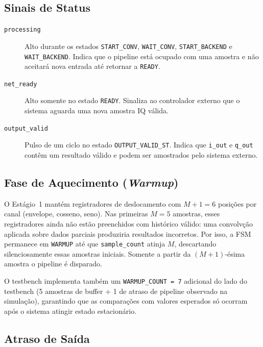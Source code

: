 \documentclass[a4paper,12pt]{article}
\begin{document}
\subsection{Sinais de Status}

\begin{description}
    \item[\texttt{processing}] Alto durante os estados \texttt{START\_CONV}, \texttt{WAIT\_CONV}, \texttt{START\_BACKEND} e \texttt{WAIT\_BACKEND}. Indica que o pipeline est\'a ocupado com uma amostra e n\~ao aceitar\'a nova entrada at\'e retornar a \texttt{READY}.

    \item[\texttt{net\_ready}] Alto somente no estado \texttt{READY}. Sinaliza ao controlador externo que o sistema aguarda uma nova amostra IQ v\'alida.

    \item[\texttt{output\_valid}] Pulso de um ciclo no estado \texttt{OUTPUT\_VALID\_ST}. Indica que \texttt{i\_out} e \texttt{q\_out} cont\^em um resultado v\'alido e podem ser amostrados pelo sistema externo.
\end{description}

\subsection{Fase de Aquecimento (\textit{Warmup})}

O Est\'agio~1 mant\'em registradores de deslocamento com $M+1=6$ posi\c{c}\~oes por canal (envelope, cosseno, seno). Nas primeiras $M=5$ amostras, esses registradores ainda n\~ao est\~ao preenchidos com hist\'orico v\'alido: uma convolv\c{c}\~ao aplicada sobre dados parciais produziria resultados incorretos. Por isso, a FSM permanece em \texttt{WARMUP} at\'e que \texttt{sample\_count} atinja $M$, descartando silenciosamente essas amostras iniciais. Somente a partir da $(M+1)$-\'esima amostra o pipeline \'e disparado.

O testbench implementa tamb\'em um \texttt{WARMUP\_COUNT = 7} adicional do lado do testbench (5 amostras de buffer + 1 de atraso de pipeline observado na simula\c{c}\~ao), garantindo que as compara\c{c}\~oes com valores esperados s\'o ocorram ap\'os o sistema atingir estado estacion\'ario.

\subsection{Atraso de Sa\'ida}
\end{document}
